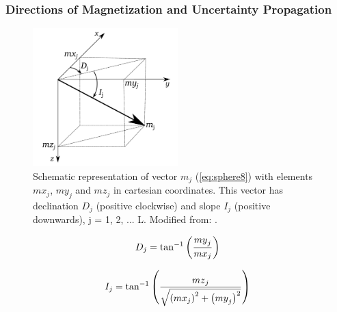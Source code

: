 \documentclass[manuscript,revised]{geophysics}
\begin{document}
\begin{FlushRight}
\end{FlushRight}




\subsubsection{Directions of Magnetization and Uncertainty Propagation}


\begin{figure}[htbp]
\centering
\includegraphics[width=0.5\textwidth]{VECTORS.pdf}
\caption{Schematic representation of vector $m_j$ (\cref{eq:sphere8}) with elements $mx_j$, $my_j$ and $mz_j$ in cartesian coordinates. This vector has declination $D_j$ (positive clockwise) and slope $I_j$ (positive downwards), j = 1, 2, ... L. Modified from: \cite{OliveiraJr.2015}.}
\label{fig:VECTORS}
\end{figure}


\begin{equation} \label{eq:sphere16}
\centering
\small D_j=\tan^{-1}{\left(\frac{{my}_j}{{mx}_j}\right)}
\end{equation}

\begin{equation} \label{eq:sphere17}
\centering
\small I_j=\tan^{-1}{\left(\frac{{mz}_j}{\sqrt{\left({mx}_j\right)^2+\left({my}_j\right)^2}}\right)}
\end{equation}
\end{document}
